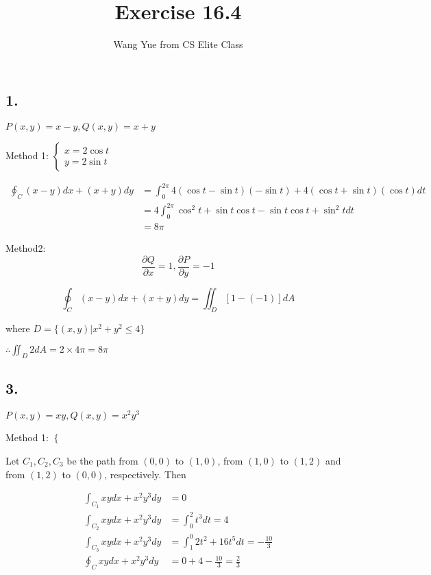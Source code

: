 \documentclass{article}
\begin{document}
  \title{Exercise 16.4}
  \author{Wang Yue from CS Elite Class}
  \maketitle

  \subsection*{1. }

  $P(x, y) = x - y, Q(x, y) = x + y$

  Method 1: $\left\{ \begin{array}{ll} x = 2\cos t \\ y = 2 \sin t \end{array}\right.$

  $$\begin{aligned}
    \oint_C (x-y) dx + (x+y)dy &= \int_0^{2\pi} 4(\cos t - \sin t)(-\sin t) + 4(\cos t + \sin t)(\cos t) dt \\
    &= 4\int_0^{2\pi} \cos^2 t + \sin t \cos t - \sin t \cos t + \sin^2 t dt \\
    &= 8\pi
  \end{aligned}$$

  Method2: $$\frac{\partial Q}{\partial x} = 1, \frac{\partial P}{\partial y} = -1$$

  $$\oint_C (x-y)dx + (x+y)dy = \iint_D [1-(-1)] dA$$

  where $D = \{ (x, y) | x^2 + y^2 \leq 4 \}$

  $\therefore \iint_D 2dA = 2 \times 4\pi = 8\pi$

  \subsection*{3. }

  $P(x, y) = xy, Q(x, y) = x^2y^3$

  Method 1: $\left\{ \begin{array}{ll}  \end{array}\right.$

  Let $C_1, C_2, C_3$ be the path from $(0, 0)$ to $(1, 0)$, from $(1, 0)$ to $(1, 2)$ and from $(1, 2)$ to $(0, 0)$, respectively. Then

  $$\begin{aligned}
    \int_{C_1} xydx + x^2y^3 dy &= 0 \\
    \int_{C_2} xydx + x^2y^3 dy &= \int_0^2 t^3 dt = 4 \\
    \int_{C_3} xydx + x^2y^3 dy &= \int_1^0 2t^2 + 16t^5 dt = -\frac{10}{3} \\
    \oint_C xydx + x^2y^3 dy &= 0 + 4 - \frac{10}{3} = \frac{2}{3}
  \end{aligned}$$
\end{document}
